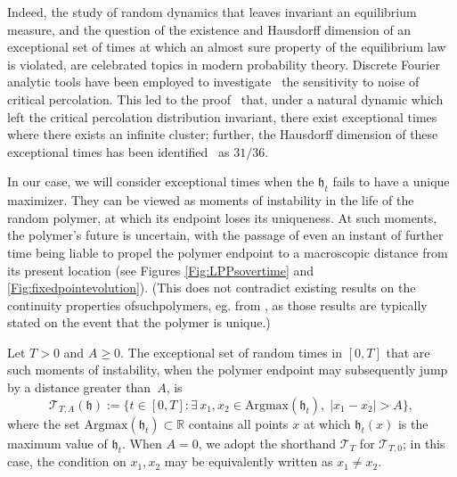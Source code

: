 \documentclass[oneside,final,11pt]{amsart}
\theoremstyle{definition}
\newcommand{\fh}{\mathfrak{h}}
\newcommand{\R}{\mathbb{R}}
\newcommand{\CT}{\mathcal{T}}
\newcommand{\1}[1]{\mathbf{1}_{#1}}
\newcommand{\Argmax}{\mathrm{Arg max}}
\numberwithin{equation}{section}
\begin{document}
Indeed,
the study of random dynamics that leaves invariant an equilibrium measure, and the question of the existence and Hausdorff dimension of an exceptional set of times at which an almost sure property of the equilibrium law is violated, are celebrated topics in modern probability theory.
Discrete Fourier analytic tools have been employed to investigate~\cite{BKS1999} the sensitivity to noise of critical percolation. This led to the proof~\cite{SS2010} that, under a natural dynamic which left the critical percolation distribution invariant, there exist exceptional times where there exists an infinite cluster; further, the Hausdorff dimension of these exceptional times has been identified~\cite{GPS2010} as $31/36$.


In our case, we will consider exceptional times when the $\fh_t$ fails to have a unique maximizer. They can be viewed as moments of instability in the life of the random polymer, at which its endpoint loses its uniqueness. At such moments, the polymer's future is uncertain, with the passage of even an instant of further time being liable to propel the polymer endpoint to a macroscopic distance from its present location (see Figures \ref{Fig:LPPsovertime} and \ref{Fig:fixedpointevolution}). (This does not contradict existing results on the continuity properties ofsuchpolymers, eg. from \cite{Landscape}, as those results are typically stated on the event that the polymer is unique.)

Let $T > 0$ and $A\geq 0$. The exceptional set of random times in $[0,T]$ that are such moments of instability, when the polymer endpoint may subsequently jump by a distance greater than~$A$, is
\begin{equation}\label{eq:TwinPeaksSet}
	\CT_{T, A}(\fh) := \bigl\{t \in [0,T] : \exists\, x_1, x_2 \in \Argmax(\fh_t),\; |x_1-x_2|> A\bigr\},
\end{equation}
where the set $\Argmax(\fh_t) \subset \R$ contains all points $x$ at which $\fh_t(x)$ is the maximum value of $\fh_t$. When $A=0$, we adopt the shorthand $\CT_{T}$ for $\CT_{T,0}$; in this case, the condition on $x_1, x_2$ may be equivalently written as $x_1\neq x_2$.
\end{document}
